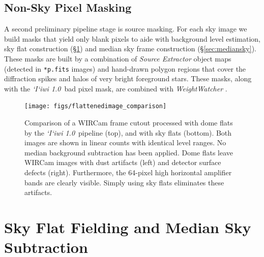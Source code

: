 \documentclass[iop]{emulateapj}
\newcommand{\sw}[1]{\textit{#1}} %
\newcommand{\iiwione}{\sw{`I`iwi 1.0}}
\newcommand{\Sec}[1]{\S\ref{sec:#1}}  %
\begin{document}
\subsection{Non-Sky Pixel Masking}

A second preliminary pipeline stage is source masking.
For each sky image we build masks that yield only blank pixels to aide with background level estimation, sky flat construction (\Sec{flats}) and median sky frame construction (\Sec{mediansky}).
These masks are built by a combination of \sw{Source Extractor} object maps (detected in \texttt{*p.fits} images) and hand-drawn polygon regions that cover the diffraction spikes and halos of very bright foreground stars.
These masks, along with the \iiwione\ bad pixel mask, are combined with \sw{WeightWatcher} \citep{Marmo:2008}.

\begin{figure}[t]
\centering
\texttt{[image: figs/flattenedimage\_comparison]}
\caption{Comparison of a WIRCam frame cutout processed with dome flats by the \iiwione\ pipeline (top), and with sky flats (bottom).
Both images are shown in linear counts with identical level ranges.
No median background subtraction has been applied.
Dome flats leave WIRCam images with dust artifacts (left) and detector surface defects (right). Furthermore, the 64-pixel high horizontal amplifier bands are clearly visible.
Simply using sky flats eliminates these artifacts.
}
\label{fig:flattenedimage_comparison}
\end{figure}


\section{Sky Flat Fielding and Median Sky Subtraction}
\label{sec:flats}
\end{document}
